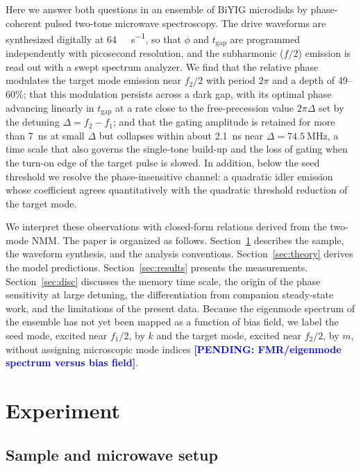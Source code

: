 \documentclass[aps,prb,reprint,superscriptaddress,floatfix]{revtex4-2}
\newcommand{\pend}[1]{\textcolor{blue}{\textbf{[PENDING: #1]}}}
\newcommand{\pend}[1]{}
\newcommand{\tgap}{t_{\mathrm{gap}}}
\begin{document}
Here we answer both questions in an ensemble of BiYIG microdisks by phase-coherent pulsed two-tone microwave spectroscopy. The drive waveforms are synthesized digitally at \SI{64}{\giga\sample\per\second}, so that $\phi$ and $\tgap$ are programmed independently with picosecond resolution, and the subharmonic ($f/2$) emission is read out with a swept spectrum analyzer. We find that the relative phase modulates the target mode emission near $f_2/2$ with period $2\pi$ and a depth of 49--60\%; that this modulation persists across a dark gap, with its optimal phase advancing linearly in $\tgap$ at a rate close to the free-precession value $2\pi\Delta$ set by the detuning $\Delta=f_2-f_1$; and that the gating amplitude is retained for more than \SI{7}{\nano\second} at small $\Delta$ but collapses within about \SI{2.1}{\nano\second} near $\Delta=\SI{74.5}{\mega\hertz}$, a time scale that also governs the single-tone build-up and the loss of gating when the turn-on edge of the target pulse is slowed. In addition, below the seed threshold we resolve the phase-insensitive channel: a quadratic idler emission whose coefficient agrees quantitatively with the quadratic threshold reduction of the target mode.

We interpret these observations with closed-form relations derived from the two-mode NMM. The paper is organized as follows. Section~\ref{sec:exp} describes the sample, the waveform synthesis, and the analysis conventions. Section~\ref{sec:theory} derives the model predictions. Section~\ref{sec:results} presents the measurements. Section~\ref{sec:disc} discusses the memory time scale, the origin of the phase sensitivity at large detuning, the differentiation from companion steady-state work, and the limitations of the present data. Because the eigenmode spectrum of the ensemble has not yet been mapped as a function of bias field, we label the seed mode, excited near $f_1/2$, by $k$ and the target mode, excited near $f_2/2$, by $m$, without assigning microscopic mode indices \pend{FMR/eigenmode spectrum versus bias field}.

\section{Experiment}\label{sec:exp}

\subsection{Sample and microwave setup}\label{sec:setup}
\end{document}
